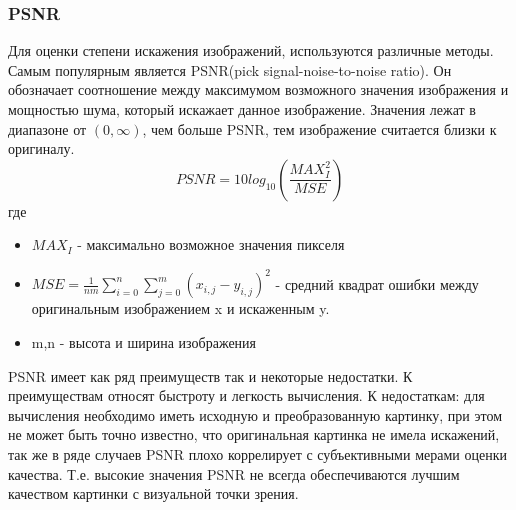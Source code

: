 \subsubsection{PSNR}\label{sec:PSNR}
Для оценки степени искажения изображений, используются различные методы. Самым популярным является PSNR(pick signal-noise-to-noise ratio). Он обозначает соотношение между максимумом возможного значения изображения и мощностью шума, который искажает данное изображение. Значения лежат в диапазоне от $(0, \infty)$, чем больше PSNR, тем изображение считается близки к оригиналу.
\begin{equation}\label{eq:PSNR}
PSNR = 10log_{10}(\frac{MAX_I^2}{MSE})
\end{equation}
где 
\begin{itemize}
	\item $MAX_I$ - максимально возможное значения пикселя
	\item $MSE = \frac{1}{nm}\sum_{i=0}^{n}\sum_{j=0}^{m}(x_{i,j} - y_{i,j})^2$ - средний квадрат ошибки между оригинальным изображением x и искаженным y.
	\item m,n - высота и ширина изображения
\end{itemize}
PSNR имеет как ряд преимуществ так и некоторые недостатки. К преимуществам относят быстроту и легкость вычисления. К недостаткам: для вычисления необходимо иметь исходную и преобразованную картинку, при этом не может быть точно известно, что  оригинальная картинка не имела искажений, так же в ряде случаев PSNR плохо коррелирует с субъективными мерами оценки  качества. Т.е. высокие значения PSNR не всегда обеспечиваются лучшим качеством картинки с визуальной точки зрения.
